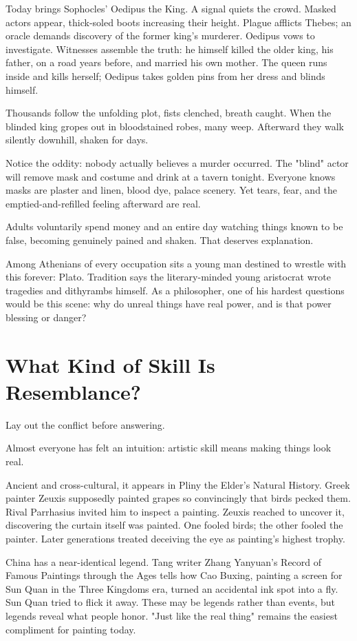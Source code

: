 Today brings Sophocles' Oedipus the King. A signal quiets the crowd. Masked actors appear, thick-soled boots increasing their height. Plague afflicts Thebes; an oracle demands discovery of the former king's murderer. Oedipus vows to investigate. Witnesses assemble the truth: he himself killed the older king, his father, on a road years before, and married his own mother. The queen runs inside and kills herself; Oedipus takes golden pins from her dress and blinds himself.

Thousands follow the unfolding plot, fists clenched, breath caught. When the blinded king gropes out in bloodstained robes, many weep. Afterward they walk silently downhill, shaken for days.

Notice the oddity: nobody actually believes a murder occurred. The "blind" actor will remove mask and costume and drink at a tavern tonight. Everyone knows masks are plaster and linen, blood dye, palace scenery. Yet tears, fear, and the emptied-and-refilled feeling afterward are real.

Adults voluntarily spend money and an entire day watching things known to be false, becoming genuinely pained and shaken. That deserves explanation.

Among Athenians of every occupation sits a young man destined to wrestle with this forever: Plato. Tradition says the literary-minded young aristocrat wrote tragedies and dithyrambs himself. As a philosopher, one of his hardest questions would be this scene: why do unreal things have real power, and is that power blessing or danger?

\section{What Kind of Skill Is Resemblance?}
Lay out the conflict before answering.

Almost everyone has felt an intuition: artistic skill means making things look real.

Ancient and cross-cultural, it appears in Pliny the Elder's Natural History. Greek painter Zeuxis supposedly painted grapes so convincingly that birds pecked them. Rival Parrhasius invited him to inspect a painting. Zeuxis reached to uncover it, discovering the curtain itself was painted. One fooled birds; the other fooled the painter. Later generations treated deceiving the eye as painting's highest trophy.

China has a near-identical legend. Tang writer Zhang Yanyuan's Record of Famous Paintings through the Ages tells how Cao Buxing, painting a screen for Sun Quan in the Three Kingdoms era, turned an accidental ink spot into a fly. Sun Quan tried to flick it away. These may be legends rather than events, but legends reveal what people honor. "Just like the real thing" remains the easiest compliment for painting today.

